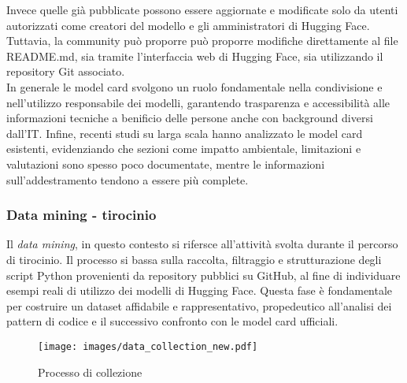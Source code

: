 \documentclass{article}
\begin{document}
Invece quelle già pubblicate possono essere aggiornate e modificate solo da utenti autorizzati come creatori del modello e gli amministratori di Hugging Face. Tuttavia, la community può proporre può proporre modifiche direttamente al file README.md, sia tramite l’interfaccia web di Hugging Face, sia utilizzando il repository Git associato.\\
In generale le model card svolgono un ruolo fondamentale nella condivisione e nell’utilizzo responsabile dei modelli, garantendo trasparenza e accessibilità alle informazioni tecniche a benificio delle persone anche con background diversi dall'IT.
Infine, recenti studi su larga scala hanno analizzato le model card esistenti, evidenziando che sezioni come impatto ambientale, limitazioni e valutazioni sono spesso poco documentate, mentre le informazioni sull’addestramento tendono a essere più complete.\cite{liang2024whatsdocumentedaisystematic}
\subsubsection{Data mining - tirocinio} \label{tirocinio}
Il \textit{data mining}, in questo contesto si rifersce all'attività svolta durante il percorso di tirocinio. Il processo si bassa sulla raccolta, filtraggio e strutturazione degli script Python provenienti da repository pubblici su GitHub, al fine di individuare esempi reali di utilizzo dei modelli di Hugging Face. Questa fase è fondamentale per costruire un dataset affidabile e rappresentativo, propedeutico all'analisi dei pattern di codice e il successivo confronto con le model card ufficiali.
\begin{figure}[htbp]
    \centering
    \texttt{[image: images/data\_collection\_new.pdf]}
    \caption{Processo di collezione~\cite{CodeXHug}}
    \label{fig:1}
\end{figure}
\end{document}
